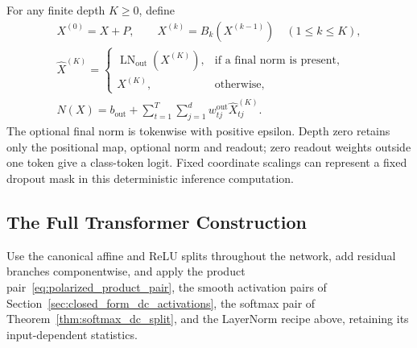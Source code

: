 \begin{definition}
For any finite depth $K\ge0$, define
\begin{equation}
\begin{gathered}
    X^{(0)}=X+P,\qquad X^{(k)}=B_k(X^{(k-1)})\quad(1\le k\le K),\\
    \widehat X^{(K)}=
    \begin{cases}\operatorname{LN}_{\mathrm{out}}(X^{(K)}),&\text{if a final norm is present},\\
    X^{(K)},&\text{otherwise},\end{cases}\\
    N(X)=b_{\mathrm{out}}+\sum_{t=1}^{T}\sum_{j=1}^{d}
           w_{tj}^{\mathrm{out}}\widehat X^{(K)}_{tj}.
\end{gathered}
    \label{eq:arbitrary_depth_transformer}
\end{equation}
The optional final norm is tokenwise with positive epsilon. Depth zero retains only the positional map, optional norm and readout; zero readout weights outside one token give a class-token logit. Fixed coordinate scalings can represent a fixed dropout mask in this deterministic inference computation.
\end{definition}

\subsection{The Full Transformer Construction}

Use the canonical affine and ReLU splits throughout the network, add residual branches componentwise, and apply the product pair~\eqref{eq:polarized_product_pair}, the smooth activation pairs of Section~\ref{sec:closed_form_dc_activations}, the softmax pair of Theorem~\ref{thm:softmax_dc_split}, and the LayerNorm recipe above, retaining its input-dependent statistics.

